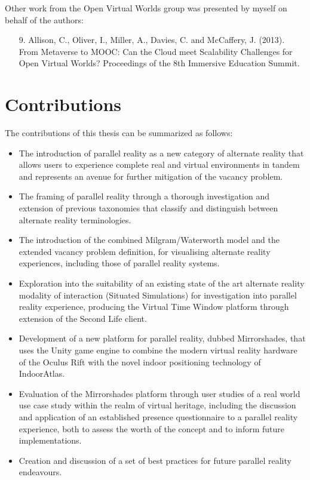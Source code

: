 
Other work from the Open Virtual Worlds group was presented by myself on behalf of the authors:

\begin{itemize}
	
	\item [9.] Allison, C., Oliver, I., Miller, A., Davies, C. and McCaffery, J. (2013). From Metaverse to MOOC: Can the Cloud meet Scalability Challenges for Open Virtual Worlds? Proceedings of the 8th Immersive Education Summit.
	
\end{itemize}



\section{Contributions}
\label{intro-contributions}
The contributions of this thesis can be summarized as follows:

\begin{itemize}
	\item The introduction of parallel reality as a new category of alternate reality that allows users to experience complete real and virtual environments in tandem and represents an avenue for further mitigation of the vacancy problem.
	\item The framing of parallel reality through a thorough investigation and extension of previous taxonomies that classify and distinguish between alternate reality terminologies.
	\item The introduction of the combined Milgram/Waterworth model and the extended vacancy problem definition, for visualising alternate reality experiences, including those of parallel reality systems.
	\item Exploration into the suitability of an existing state of the art alternate reality modality of interaction (Situated Simulations) for investigation into parallel reality experience, producing the Virtual Time Window platform through extension of the Second Life client.
	\item Development of a new platform for parallel reality, dubbed Mirrorshades, that uses the Unity game engine to combine the modern virtual reality hardware of the Oculus Rift with the novel indoor positioning technology of IndoorAtlas.
	\item Evaluation of the Mirrorshades platform through user studies of a real world use case study within the realm of virtual heritage, including the discussion and application of an established presence questionnaire to a parallel reality experience, both to assess the worth of the concept and to inform future implementations.
	\item Creation and discussion of a set of best practices for future parallel reality endeavours.
\end{itemize}

